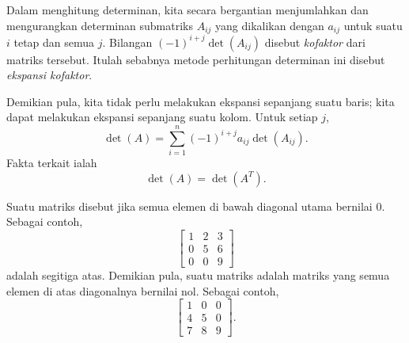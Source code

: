 Dalam menghitung determinan,
kita secara bergantian menjumlahkan dan mengurangkan determinan submatriks
$A_{ij}$ yang dikalikan dengan $a_{ij}$ untuk suatu $i$ tetap dan semua $j$.
Bilangan ${(-1)}^{i+j}\det(A_{ij})$ disebut
\emph{kofaktor}
dari matriks tersebut. Itulah sebabnya
metode perhitungan determinan ini disebut
\emph{ekspansi kofaktor}.

Demikian pula, kita tidak perlu melakukan ekspansi sepanjang suatu baris; kita dapat melakukan ekspansi
sepanjang suatu kolom. Untuk setiap $j$,
\begin{equation*}
\det (A)
=
\sum_{i=1}^n
{(-1)}^{i+j}
a_{ij} \det (A_{ij}) .
\end{equation*}
Fakta terkait ialah
\begin{equation*}
\det (A) = \det (A^T) .
\end{equation*}

\medskip

Suatu matriks disebut \emph{} jika semua elemen di bawah
diagonal utama bernilai 0. Sebagai contoh,
\begin{equation*}
\begin{bmatrix}
1 & 2 & 3 \\
0 & 5 & 6 \\
0 & 0 & 9
\end{bmatrix}
\end{equation*}
adalah segitiga atas. Demikian pula, suatu matriks \emph{}
adalah matriks yang semua elemen di atas diagonalnya bernilai nol. Sebagai contoh,
\begin{equation*}
\begin{bmatrix}
1 & 0 & 0 \\
4 & 5 & 0 \\
7 & 8 & 9
\end{bmatrix} .
\end{equation*}

